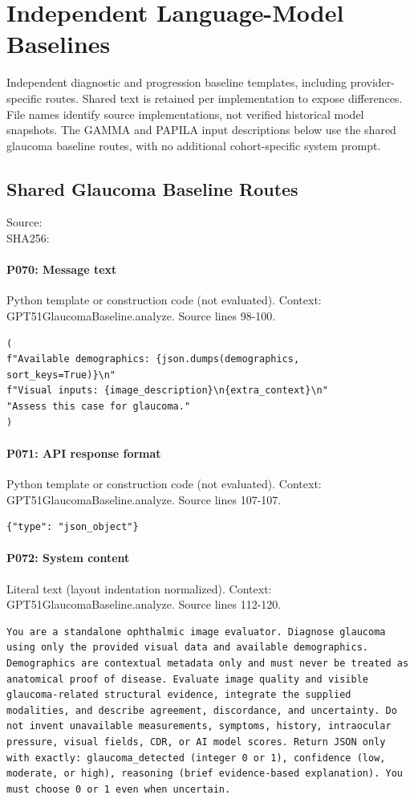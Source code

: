 \documentclass[10pt]{article}
\begin{document}
\section{Independent Language-Model Baselines}
Independent diagnostic and progression baseline templates, including provider-specific routes. Shared text is retained per implementation to expose differences. File names identify source implementations, not verified historical model snapshots. The GAMMA and PAPILA input descriptions below use the shared glaucoma baseline routes, with no additional cohort-specific system prompt.
\subsection{Shared Glaucoma Baseline Routes}
Source: \\
SHA256: {\scriptsize{}}
\paragraph{P070: Message text}
Python template or construction code (not evaluated). Context: GPT51GlaucomaBaseline.analyze. Source lines 98-100.
\begin{Verbatim}
(
f"Available demographics: {json.dumps(demographics, sort_keys=True)}\n"
f"Visual inputs: {image_description}\n{extra_context}\n"
"Assess this case for glaucoma."
)
\end{Verbatim}
\paragraph{P071: API response format}
Python template or construction code (not evaluated). Context: GPT51GlaucomaBaseline.analyze. Source lines 107-107.
\begin{Verbatim}
{"type": "json_object"}
\end{Verbatim}
\paragraph{P072: System content}
Literal text (layout indentation normalized). Context: GPT51GlaucomaBaseline.analyze. Source lines 112-120.
\begin{Verbatim}
You are a standalone ophthalmic image evaluator. Diagnose glaucoma using only the provided visual data and available demographics. Demographics are contextual metadata only and must never be treated as anatomical proof of disease. Evaluate image quality and visible glaucoma-related structural evidence, integrate the supplied modalities, and describe agreement, discordance, and uncertainty. Do not invent unavailable measurements, symptoms, history, intraocular pressure, visual fields, CDR, or AI model scores. Return JSON only with exactly: glaucoma_detected (integer 0 or 1), confidence (low, moderate, or high), reasoning (brief evidence-based explanation). You must choose 0 or 1 even when uncertain.
\end{Verbatim}
\end{document}
